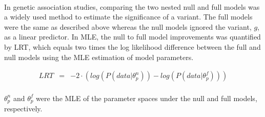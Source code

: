 \documentclass[12pt]{article}
\begin{document}
\paragraph{}{
In genetic association studies, comparing the two nested null and full models was a widely used method to estimate the significance of a variant. The full models were the same as described above whereas the null models ignored the variant, $g$, as a linear predictor. In MLE, the null to full model improvements was quantified by LRT, which equals two times the log likelihood difference between the full and null models using the MLE estimation of model parameters.
}

\begin{eqnarray}
LRT & = & -2 \cdot (log(P(data | \theta^n_p)) - log(P(data | \theta^f_p)))
\end{eqnarray}

\paragraph{}{
$\theta^n_p$ and $\theta^f_p$ were the MLE of the parameter spaces under the null and full models, respectively. 
}


\end{document}
